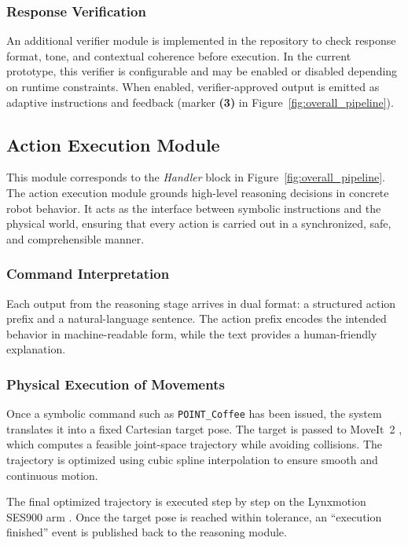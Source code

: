 \documentclass[pdflatex,sn-basic,Numbered,iicol,twocolumn]{sn-jnl}%
\begin{document}
\subsubsection{Response Verification}

An additional verifier module is implemented in the repository to check response format, tone, and contextual coherence before execution. In the current prototype, this verifier is configurable and may be enabled or disabled depending on runtime constraints. When enabled, verifier-approved output is emitted as adaptive instructions and feedback (marker \textbf{(3)} in Figure~\ref{fig:overall_pipeline}).

\subsection{Action Execution Module}

This module corresponds to the \textit{Handler} block in Figure~\ref{fig:overall_pipeline}. The action execution module grounds high-level reasoning decisions in concrete robot behavior. It acts as the interface between symbolic instructions and the physical world, ensuring that every action is carried out in a synchronized, safe, and comprehensible manner.

\subsubsection{Command Interpretation}
Each output from the reasoning stage arrives in dual format: a structured action prefix and a natural-language sentence. The action prefix encodes the intended behavior in machine-readable form, while the text provides a human-friendly explanation.

\subsubsection{Physical Execution of Movements}
Once a symbolic command such as \texttt{POINT\_Coffee} has been issued, the system translates it into a fixed Cartesian target pose. The target is passed to MoveIt~2 \cite{Sucan2013}, which computes a feasible joint-space trajectory while avoiding collisions. The trajectory is optimized using cubic spline interpolation \cite{Mellinger2011} to ensure smooth and continuous motion.

The final optimized trajectory is executed step by step on the Lynxmotion SES900 arm \cite{Lynxmotion2023}. Once the target pose is reached within tolerance, an ``execution finished'' event is published back to the reasoning module.
\end{document}
